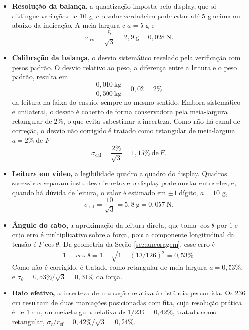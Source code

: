 \begin{itemize}
    \item \textbf{Resolução da balança,} a quantização imposta pelo display, que só distingue
    variações de $10$ g, e o valor verdadeiro pode estar até $5$ g acima ou abaixo
    da indicação. A meia-largura é $a = 5$ g e
    \begin{equation}\label{eq:sigma_resolucao}
    \sigma_{\mathrm{res}} = \frac{5}{\sqrt{3}} = 2{,}9\ \mathrm{g} = 0{,}028\ \mathrm{N}.
    \end{equation}
    \item \textbf{Calibração da balança,} o desvio sistemático revelado pela verificação com
    pesos padrão. O desvio relativo ao peso, a diferença entre a leitura e o peso padrão,
    resulta em
    \begin{equation}\label{eq:desvio_calibracao}
    \frac{0{,}010\ \mathrm{kg}}{0{,}500\ \mathrm{kg}} = 0{,}02 = 2\%
    \end{equation}
    da leitura na faixa do ensaio, sempre no mesmo sentido. Embora sistemático e
    unilateral, o desvio é coberto de forma conservadora pela meia-largura retangular de
    $2\%$, o que evita subestimar a incerteza. Como não há canal de correção,
    o desvio não corrigido é tratado como retangular de meia-largura $a = 2\%$ de $F$
    \begin{equation}\label{eq:sigma_calibracao}
    \sigma_{\mathrm{cal}} = \frac{2\%}{\sqrt{3}} = 1{,}15\% \ \text{de}\ F.
    \end{equation}
    \item \textbf{Leitura em vídeo,} a legibilidade quadro a quadro do display. Quadros
    sucessivos separam instantes discretos e o display pode mudar entre eles, e,
    quando há dúvida de leitura, o valor é estimado em $\pm 1$ dígito, $a = 10$ g,
    \begin{equation}\label{eq:sigma_video}
    \sigma_{\mathrm{vid}} = \frac{10}{\sqrt{3}} = 5{,}8\ \mathrm{g} = 0{,}057\ \mathrm{N}.
    \end{equation}
    \item \textbf{Ângulo do cabo,} a aproximação da leitura direta, que toma $\cos\theta$
    por $1$ e cujo erro é multiplicativo sobre a força, pois a componente longitudinal da
    tensão é $F\cos\theta$. Da geometria da Seção \ref{sec:ancoragem}, esse erro é
    \begin{equation}\label{eq:erro_cabo}
    1 - \cos\theta = 1 - \sqrt{1 - (13/126)^2} = 0{,}53\%.
    \end{equation}
    Como não é corrigido, é tratado como retangular de meia-largura $a = 0{,}53\%$,
    e $\sigma_{\theta} = 0{,}53\%/\sqrt{3} = 0{,}31\%$ da força.
    \item \textbf{Raio efetivo,} a incerteza de marcação relativa à distância percorrida.
    Os $236$ cm resultam de duas marcações posicionadas com fita, cuja resolução prática é
    de $1$ cm, ou meia-largura relativa de $1/236 = 0{,}42\%$, tratada como retangular,
    $\sigma_r/r_\mathrm{ef} = 0{,}42\%/\sqrt{3} = 0{,}24\%$.
\end{itemize}

